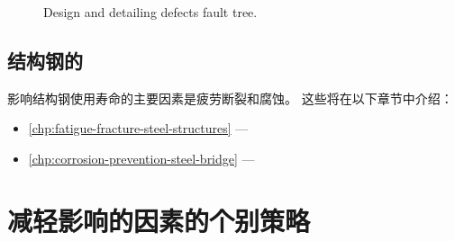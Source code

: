 \begin{figure}
  \caption{Design and detailing defects fault tree.}
  \label{fig:fault-tree-design-detailing}
\end{figure}

\subsection{结构钢的}
影响结构钢使用寿命的主要因素是疲劳断裂和腐蚀。 这些将在以下章节中介绍：

\begin{itemize}
  \item \cref{chp:fatigue-fracture-steel-structures} — 
  \item \cref{chp:corrosion-prevention-steel-bridge} — 
\end{itemize}

\section{减轻影响的因素的个别策略}
\label{sec:individual-strategies}
